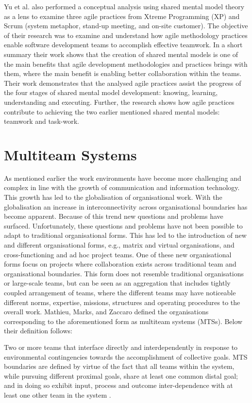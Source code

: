 Yu et al. \cite{} also performed a conceptual analysis using shared mental model theory as a lens to examine three agile practices from Xtreme Programming (XP) and Scrum (system metaphor, stand-up meeting, and on-site customer). The objective of their research was to examine and understand how agile methodology practices enable software development teams to accomplish effective teamwork. In a short summary their work shows that the creation of shared mental models is one of the main benefits that agile development methodologies and practices brings with them, where the main benefit is enabling better collaboration within the teams. Their work demonstrates that the analysed agile practices assist the progress of the four stages of shared mental model development: knowing, learning, understanding and executing. Further, the research shows how agile practices contribute to achieving the two earlier mentioned shared mental models: teamwork and task-work.

\section{Multiteam Systems}
As mentioned earlier the work environments have become more challenging and complex in line with the growth of communication and information technology. This growth has led to the globalisation of organisational work. With the globalisation an increase in interconnectivity across organisational boundaries has become apparent. Because of this trend new questions and problems have surfaced. Unfortunately, these questions and problems have not been possible to adapt to traditional organisational forms. This has led to the introduction of new and different organisational forms, e.g., matrix and virtual organisations, and cross-functioning and ad hoc project teams. One of these new organisational forms focus on projects where collaboration exists across traditional team and organisational boundaries. This form does not resemble traditional organisations or large-scale teams, but can be seen as an aggregation that includes tightly coupled arrangement of teams, where the different teams may have noticeable different norms, expertise, missions, structures and operating procedures to the overall work. Mathieu, Marks, and Zaccaro \cite{TODO} defined the organisations corresponding to the aforementioned form as multiteam systems (MTSs). Below their definition follows:

\begin{fancyquotes}
Two or more teams that interface directly and interdependently in response to environmental contingencies towards the accomplishment of collective goals. MTS boundaries are defined by virtue of the fact that all teams within the system, while pursuing different proximal goals, share at least one common distal goal; and in doing so exhibit input, process and outcome inter-dependence with at least one other team in the system \cite{TODO}.
\end{fancyquotes}

